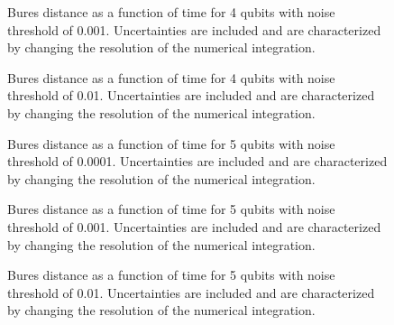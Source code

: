 \pagebreak

\begin{figure}[h]
\begin{center}
\end{center}
\caption{Bures distance as a function of time for 4 qubits with noise
threshold of 0.001.  Uncertainties are included and are characterized 
by changing the resolution of the numerical integration.}
\end{figure}

\pagebreak

\begin{figure}[h]
\begin{center}
\end{center}
\caption{Bures distance as a function of time for 4 qubits with noise
threshold of 0.01.  Uncertainties are included and are characterized 
by changing the resolution of the numerical integration.}
\end{figure}

\pagebreak

\begin{figure}[h]
\begin{center}
\end{center}
\caption{Bures distance as a function of time for 5 qubits with noise
threshold of 0.0001.  Uncertainties are included and are characterized 
by changing the resolution of the numerical integration.}
\end{figure}

\pagebreak

\begin{figure}[h]
\begin{center}
\end{center}
\caption{Bures distance as a function of time for 5 qubits with noise
threshold of 0.001.  Uncertainties are included and are characterized 
by changing the resolution of the numerical integration.}
\end{figure}

\pagebreak

\begin{figure}[h]
\begin{center}
\end{center}
\caption{Bures distance as a function of time for 5 qubits with noise
threshold of 0.01.  Uncertainties are included and are characterized 
by changing the resolution of the numerical integration.}
\end{figure}

